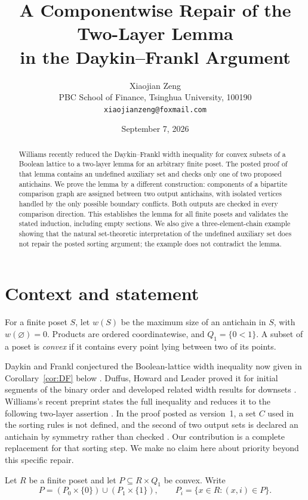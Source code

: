 \documentclass[11pt]{article}
\title{A Componentwise Repair of the Two-Layer Lemma\\
in the Daykin--Frankl Argument}
\author{Xiaojian Zeng\\
\small PBC School of Finance, Tsinghua University, 100190\\
\small \texttt{xiaojianzeng@foxmail.com}}
\date{September 7, 2026}
\newcommand{\Q}{Q}
\begin{document}
\maketitle

\begin{abstract}
Williams recently reduced the Daykin--Frankl width inequality for convex
subsets of a Boolean lattice to a two-layer lemma for an arbitrary finite
poset.  The posted proof of that lemma contains an undefined auxiliary set
and checks only one of two proposed antichains.  We prove the lemma by a
different construction: components of a bipartite comparison graph are
assigned between two output antichains, with isolated vertices handled by
the only possible boundary conflicts.  Both outputs are checked in every
comparison direction.  This establishes the lemma for all finite posets and
validates the stated induction, including empty sections.  We also give a
three-element-chain example showing that the natural set-theoretic
interpretation of the undefined auxiliary set does not repair the posted
sorting argument; the example does not contradict the lemma.
\end{abstract}

\section{Context and statement}

For a finite poset $S$, let $w(S)$ be the maximum size of an antichain in
$S$, with $w(\varnothing)=0$.  Products are ordered coordinatewise, and
$\Q_1=\{0<1\}$.  A subset of a poset is \emph{convex} if it contains every
point lying between two of its points.

Daykin and Frankl conjectured the Boolean-lattice width inequality now given
in Corollary~\ref{cor:DF} below \cite{DaykinFrankl1983}.  Duffus, Howard and
Leader proved it for initial segments of the binary order and developed
related width results for downsets \cite{DuffusHowardLeader2019}.  Williams's
recent preprint states the full inequality and reduces it to the following
two-layer assertion \cite[Lemma~2]{Williams2026}.  In the proof posted as
version~1, a set $C$ used in the sorting rules is not defined, and the second
of two output sets is declared an antichain by symmetry rather than checked
\cite[Section~3]{Williams2026}.  Our contribution is a complete replacement
for that sorting step.  We make no claim here about priority beyond this
specific repair.

Let $R$ be a finite poset and let $P\subseteq R\times\Q_1$ be convex.  Write
\[
  P=(P_0\times\{0\})\cup(P_1\times\{1\}),
  \qquad P_i=\{x\in R:(x,i)\in P\}.
\]
\end{document}
